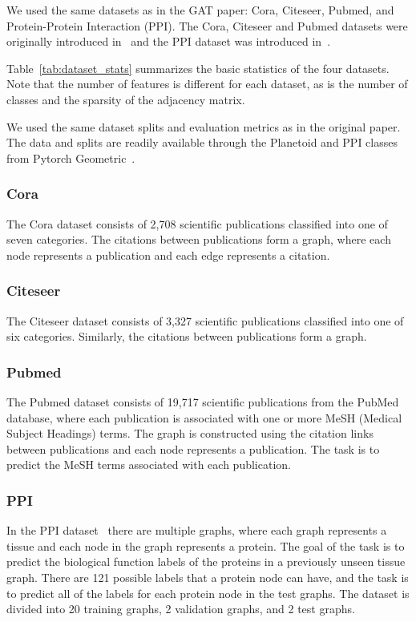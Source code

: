 We used the same datasets as in the GAT paper: Cora, Citeseer, Pubmed, and
Protein-Protein Interaction (PPI). The Cora, Citeseer and Pubmed datasets were
originally introduced in~\cite{sen2008collective} and the PPI dataset was
introduced in~\cite{hamilton2017inductive}.

Table~\ref{tab:dataset_stats} summarizes the basic statistics of the four
datasets. Note that the number of features is different for each dataset, as
is the number of classes and the sparsity of the adjacency matrix.

We used the same dataset splits and evaluation metrics as in the original
paper. The data and splits are readily available through the Planetoid and PPI
classes from Pytorch Geometric~\cite{pytorchgeometric}.

\subsubsection{Cora}
The Cora dataset consists of 2,708 scientific publications classified into one
of seven categories. The citations between publications form a graph, where
each node represents a publication and each edge represents a citation.

\subsubsection{Citeseer}
The Citeseer dataset consists of 3,327 scientific publications classified into
one of six categories. Similarly, the citations between publications form a
graph.

\subsubsection{Pubmed}
The Pubmed dataset consists of 19,717 scientific publications from the PubMed
database, where each publication is associated with one or more MeSH (Medical
Subject Headings) terms. The graph is constructed using the citation links
between publications and each node represents a publication. The task is to
predict the MeSH terms associated with each publication.

\subsubsection{PPI}
In the PPI dataset~\cite{zitnik2017predicting} there are multiple graphs, where each graph represents a
tissue and each node in the graph represents a protein. The goal of the task
is to predict the biological function labels of the proteins in a previously
unseen tissue graph. There are 121 possible labels that a protein node can
have, and the task is to predict all of the labels for each protein node in the
test graphs. The dataset is divided into 20 training graphs, 2 validation
graphs, and 2 test graphs.

